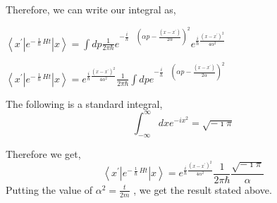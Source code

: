 \documentclass{article}
\begin{document}
Therefore, we can write our integral as,

\( \left\langle x^{\prime}\left|e^{-\frac{\imath}{\hbar} H t}\right| x\right\rangle=\int d p \frac{1}{2 \pi \hbar} e^{-\frac{i}{h} \quad\left(\alpha p-\frac{\left(x-x^{\prime}\right)}{2 \alpha}\right)^{2}} e^{\frac{i}{\hbar} \frac{\left(x-x^{\prime}\right)^{2}}{4 \alpha^{2}}} \)


\( \left\langle x^{\prime}\left|e^{-\frac{\imath}{\hbar} H t}\right| x\right\rangle= e^{\frac{i}{\hbar} \frac{\left(x-x^{\prime}\right)^{2}}{4 \alpha^{2}}}  \frac{1}{2 \pi \hbar} \int d p e^{-\frac{i}{h} \quad\left(\alpha p-\frac{\left(x-x^{\prime}\right)}{2 \alpha}\right)^{2}}  \)


The following is a standard integral,
\[
\int_{-\infty}^{\infty} d x e^{-i x^{2}}=\sqrt{-\imath \pi}
\]

Therefore we get,
$$ \left\langle x^{\prime}\left|e^{-\frac{\imath}{\hbar} H t}\right| x\right\rangle= e^{\frac{i}{\hbar} \frac{\left(x-x^{\prime}\right)^{2}}{4 \alpha^{2}}}  \frac{1}{2 \pi \hbar} \frac{\sqrt{-\imath \pi}}{\alpha}  $$
Putting the value of $\alpha^{2} = \frac{t}{2 m}$ , we get the result stated above.
\end{document}
